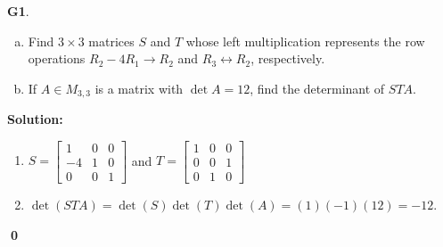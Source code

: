 \documentclass{article}
\newenvironment{problem}[1]
{
  \begin{flushleft}
  \textbf{#1}.
  \ignorespaces
}
{
  \end{flushleft}
}
\newenvironment{solution}
{
  \ignorespaces
  \textbf{Solution:}
}
{
  \ignorespacesafterend
  \begin{flushright}
  {\bfseries \qed}
  \end{flushright}
}
\begin{document}
\begin{problem}{G1}
\begin{enumerate}[(a)]
\item Find \(3 \times 3\) matrices \(S\) and \(T\) whose left multiplication represents the row operations \(R_2-4R_1 \to R_2\) and \(R_3 \leftrightarrow R_2\), respectively.
\item If \(A \in M_{3,3}\) is a matrix with \(\det A = 12\), find the determinant of \(STA\). 
\end{enumerate}
\end{problem}
\begin{solution}
\begin{enumerate}
\item 
\(S=\begin{bmatrix} 1 & 0 & 0 \\ -4 & 1 & 0 \\ 0 & 0 & 1 \end{bmatrix}\) and \(T=\begin{bmatrix} 1 & 0 & 0 \\ 0 & 0 & 1 \\ 0 & 1 & 0 \end{bmatrix}\)
\item \(\det (STA) = \det(S) \det(T) \det(A) = (1) (-1) (12) = -12\).
\end{enumerate}
\end{solution}
\end{document}
